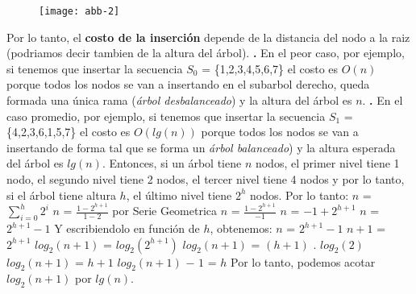 \documentclass[10pt,a4paper]{article}
\begin{document}
\begin{figure}[h]
	\centering
	\texttt{[image: abb-2]}
	\label{drivers1}
\end{figure}
\newpage

Por lo tanto, el \textbf{costo de la inserción} depende de la  distancia del nodo a la raiz (podriamos decir tambien de la altura del árbol).
\newline
\newline
\textbf{.} En el peor caso, por ejemplo, si tenemos que insertar la secuencia $S_{0}$ = \{1,2,3,4,5,6,7\} el costo es $O(n)$ porque todos los nodos se van a insertando en el subarbol derecho, queda formada una única rama (\textit{árbol desbalanceado}) y la altura del árbol es $n$.
\newline
\newline
\textbf{.} En el caso promedio, por ejemplo, si tenemos que insertar la secuencia $S_{1}$ = \{4,2,3,6,1,5,7\} el costo es $O(lg(n))$ porque todos los nodos se van a insertando de forma tal que se forma un \textit{árbol balanceado}) y la altura esperada del árbol es $lg(n)$.
\newline
\newline
Entonces, si un árbol tiene $n$ nodos, el primer nivel tiene 1 nodo, el segundo nivel tiene 2 nodos, el tercer nivel tiene 4 nodos y por lo tanto, si el árbol tiene altura $h$, el último nivel tiene $2^{h}$ nodos. Por lo tanto:
\newline
\newline
$n$ = $\displaystyle \sum_{i=0}^{h} 2^{i}$
\newline
\newline
\newline
$n$ = $\displaystyle \frac{1-2^{h+1}}{1-2}$ por Serie Geometrica
\newline
\newline
\newline
$n$ = $\displaystyle \frac{1-2^{h+1}}{-1}$
\newline
\newline
\newline
$n$ = $-1+2^{h+1}$
\newline
\newline
$n$ = $2^{h+1} - 1$
\newline
\newline
Y escribiendolo en función de $h$, obtenemos:
\newline
\newline
$n$ = $2^{h+1} - 1$
\newline
\newline
$n + 1$ = $2^{h+1}$
\newline
\newline
$log_{2}(n+1)$ = $log_{2}(2^{h+1})$
\newline
\newline
$log_{2}(n+1)$ = $(h+1)$ . $log_{2}(2)$
\newline
\newline
$log_{2}(n+1)$ = $h+1$
\newline
\newline
$log_{2}(n+1)$ $-$ $1$ = $h$
\newline
\newline
Por lo tanto, podemos acotar $log_{2}(n+1)$ por $lg(n)$. 
\newpage 
\end{document}
